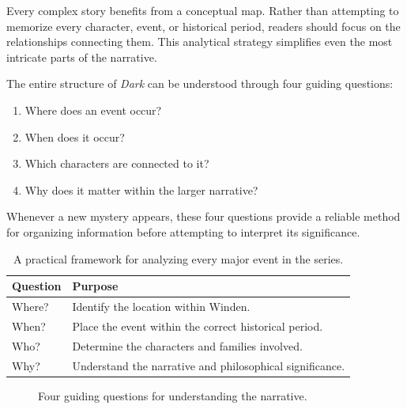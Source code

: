 \documentclass[12pt,oneside,openany]{book}
\begin{document}
Every complex story benefits from a conceptual map. Rather than attempting to
memorize every character, event, or historical period, readers should focus on
the relationships connecting them. This analytical strategy simplifies even
the most intricate parts of the narrative.

The entire structure of \textit{Dark} can be understood through four guiding
questions:

\begin{enumerate}
\item Where does an event occur?
\item When does it occur?
\item Which characters are connected to it?
\item Why does it matter within the larger narrative?
\end{enumerate}

Whenever a new mystery appears, these four questions provide a reliable method
for organizing information before attempting to interpret its significance.

\begin{table}[H]
\centering
\begin{tabular}{|p{4cm}|p{8cm}|}
\hline
\textbf{Question} & \textbf{Purpose} \\
\hline
Where? & Identify the location within Winden.\\
\hline
When? & Place the event within the correct historical period.\\
\hline
Who? & Determine the characters and families involved.\\
\hline
Why? & Understand the narrative and philosophical significance.\\
\hline
\end{tabular}
\caption{A practical framework for analyzing every major event in the series.}
\end{table}

\begin{figure}[H]
\centering
{}
\caption{Four guiding questions for understanding the narrative.}
\end{figure}
\end{document}
